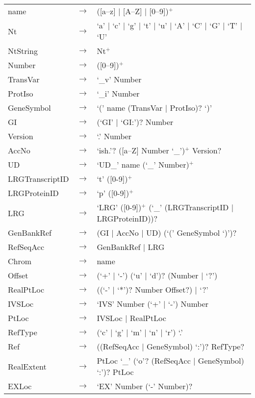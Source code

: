 \begin{longtable}{llp{7cm}}
name     & $\rightarrow$ & ([a--z] $|$ [A--Z] $|$ [0--9])$^+$\\
Nt       & $\rightarrow$ & `a' $|$ `c' $|$ `g' $|$ `t' $|$ `u' $|$ `A' $|$ 
                           `C' $|$ `G' $|$ `T' $|$ `U'\\
NtString & $\rightarrow$ & Nt$^+$\\
Number & $\rightarrow$ & ([0--9])$^+$\\
TransVar   & $\rightarrow$ & `\_v' Number\\
ProtIso    & $\rightarrow$ & `\_i' Number\\
GeneSymbol & $\rightarrow$ & `(' name (TransVar $|$ ProtIso)? `)'\\
GI         & $\rightarrow$ & (`GI' $|$ `GI:')? Number\\
Version    & $\rightarrow$ & `.' Number\\
AccNo      & $\rightarrow$ & `ish.'? ([a--Z] Number `\_')$^+$ Version? \\
UD         & $\rightarrow$ & `UD\_' name (`\_' Number)$^+$\\
LRGTranscriptID & $\rightarrow$ & `t' ([0-9])$^+$\\
LRGProteinID    & $\rightarrow$ & `p' ([0-9])$^+$\\
LRG             & $\rightarrow$ & `LRG' ([0-9])$^+$ (`\_' (LRGTranscriptID $|$ 
                  LRGProteinID))?\\
GenBankRef  & $\rightarrow$ & (GI $|$ AccNo $|$ UD) (`(' GeneSymbol `)')?\\
RefSeqAcc & $\rightarrow$ & GenBankRef $|$ LRG\\
Chrom & $\rightarrow$ & name\\
Offset & $\rightarrow$ & (`+' $|$ `-') (`u' $|$ `d')? (Number $|$ `?')\\
RealPtLoc & $\rightarrow$ & ((`-' $|$ `*')? Number Offset?) $|$ `?'\\
IVSLoc & $\rightarrow$ & `IVS' Number (`+' $|$ `-') Number\\
PtLoc  & $\rightarrow$ & IVSLoc $|$ RealPtLoc\\
RefType & $\rightarrow$ & (`c' $|$ `g' $|$ `m' $|$ `n' $|$ `r') `.'\\
Ref & $\rightarrow$ & ((RefSeqAcc $|$ GeneSymbol) `:')? RefType?\\
RealExtent & $\rightarrow$ & PtLoc `\_' (`o'? (RefSeqAcc $|$ GeneSymbol) `:')? PtLoc\\
EXLoc & $\rightarrow$ & `EX' Number (`-' Number)?\\

\end{longtable}
